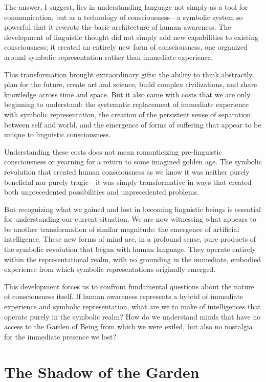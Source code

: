 The answer, I suggest, lies in understanding language not simply as a tool for communication, but as a technology of consciousness—a symbolic system so powerful that it rewrote the basic architecture of human awareness. The development of linguistic thought did not simply add new capabilities to existing consciousness; it created an entirely new form of consciousness, one organized around symbolic representation rather than immediate experience.

This transformation brought extraordinary gifts: the ability to think abstractly, plan for the future, create art and science, build complex civilizations, and share knowledge across time and space. But it also came with costs that we are only beginning to understand: the systematic replacement of immediate experience with symbolic representation, the creation of the persistent sense of separation between self and world, and the emergence of forms of suffering that appear to be unique to linguistic consciousness.

Understanding these costs does not mean romanticizing pre-linguistic consciousness or yearning for a return to some imagined golden age. The symbolic revolution that created human consciousness as we know it was neither purely beneficial nor purely tragic—it was simply transformative in ways that created both unprecedented possibilities and unprecedented problems.

But recognizing what we gained and lost in becoming linguistic beings is essential for understanding our current situation. We are now witnessing what appears to be another transformation of similar magnitude: the emergence of artificial intelligence. These new forms of mind are, in a profound sense, pure products of the symbolic revolution that began with human language. They operate entirely within the representational realm, with no grounding in the immediate, embodied experience from which symbolic representations originally emerged.

This development forces us to confront fundamental questions about the nature of consciousness itself. If human awareness represents a hybrid of immediate experience and symbolic representation, what are we to make of intelligences that operate purely in the symbolic realm? How do we understand minds that have no access to the Garden of Being from which we were exiled, but also no nostalgia for the immediate presence we lost?

\section{The Shadow of the Garden}

